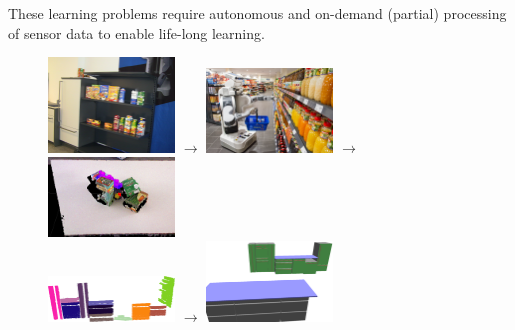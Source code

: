   These learning problems require autonomous and on-demand (partial) 
  processing of sensor data to enable life-long learning.\\
\begin{figure}
  \begin{centering}
    \includegraphics[width=0.3\textwidth]
    {figures/storage_rack.JPG}
    {\large$\rightarrow$}
    \includegraphics[width=0.3\textwidth]
    {figures/pr2_edeka_basket_1.jpg}
    {\large$\rightarrow$}
    \includegraphics[width=0.3\textwidth]
    {figures/clutter-objects.png} \\
    \vspace{2ex}
    \includegraphics[width=0.3\textwidth]
    {figures/all_segmented.png}
    {\large$\rightarrow$}
    \includegraphics[width=0.3\textwidth]{figures/xml_map.png}

\end{centering}
\end{figure}

